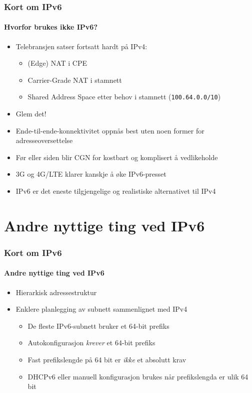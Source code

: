\begin{frame}%
  \frametitle{Kort om IPv6}
  \framesubtitle{Hvorfor brukes ikke IPv6?}
  \begin{itemize}[<+->]
  \item Telebransjen satser fortsatt hardt på IPv4:
    \begin{itemize}[<+->]
    \item (Edge) NAT i CPE\hfill{}
    \item Carrier-Grade NAT i stamnett\hfill{}
    \item Shared Address Space etter behov i stamnett (\texttt{100.64.0.0/10})\hfill{}
    \end{itemize}
  \item Glem det!
  \item Ende-til-ende-konnektivitet oppnås best uten noen former for
    adresseoversettelse
  \item Før eller siden blir CGN for kostbart og komplisert å vedlikeholde
  \item 3G og 4G/LTE klarer kanskje å øke IPv6-presset\hfill{}
  \item \alert<8>{IPv6 er det eneste tilgjengelige og realistiske alternativet til IPv4}
  \end{itemize}
\end{frame}

\section{Andre nyttige ting ved IPv6}
\begin{frame}%
  \frametitle{Kort om IPv6}
  \framesubtitle{Andre nyttige ting ved IPv6}
  \pause
  \begin{itemize}[<+->]
  \item Hierarkisk adressestruktur
  \item Enklere planlegging av subnett sammenlignet med IPv4
    \begin{itemize}[<+->]
    \item De fleste IPv6-subnett bruker et 64-bit prefiks
    \item Autokonfigurasjon \textit{krever\/} et 64-bit prefiks
    \item Fast prefikslengde på 64 bit er \textit{ikke\/} et absolutt
      krav
    \item DHCPv6 eller manuell konfigurasjon brukes når prefikslengda
      er ulik 64 bit
    \end{itemize}
  \end{itemize}
\end{frame}

